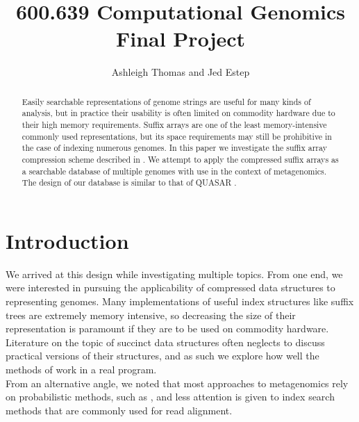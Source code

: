 \documentclass{article}
\begin{document}
\title{600.639 Computational Genomics\\
Final Project}
\date{}
\author{Ashleigh Thomas and Jed Estep}
\maketitle

\begin{abstract}
Easily searchable representations of genome strings are useful for many kinds of analysis, but in practice their usability is often limited on commodity hardware due to their high memory requirements. Suffix arrays are one of the least memory-intensive commonly used representations, but its space requirements may still be prohibitive in the case of indexing numerous genomes. In this paper we investigate the suffix array compression scheme described in \cite{GV05}. We attempt to apply the compressed suffix arrays as a searchable database of multiple genomes with use in the context of metagenomics. The design of our database is similar to that of QUASAR \cite{B99}.
\end{abstract}
\section{Introduction}
\indent We arrived at this design while investigating multiple topics. From one end, we were interested in pursuing the applicability of compressed data structures to representing genomes. Many implementations of useful index structures like suffix trees are extremely memory intensive, so decreasing the size of their representation is paramount if they are to be used on commodity hardware. Literature on the topic of succinct data structures often neglects to discuss practical versions of their structures, and as such we explore how well the methods of \cite{GV05} work in a real program.\\
\indent From an alternative angle, we noted that most approaches to metagenomics rely on probabilistic methods, such as \cite{BS09}, and less attention is given to index search methods that are commonly used for read alignment. 
\end{document}
